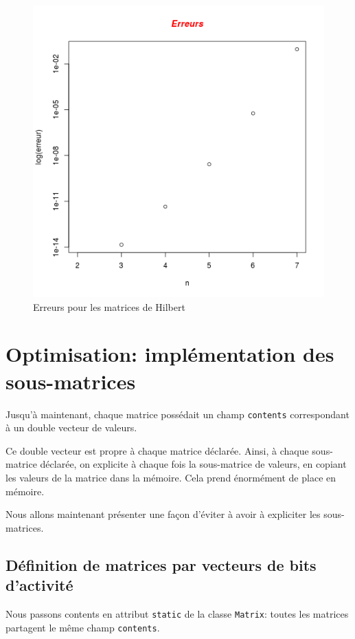\documentclass[a4paper,11pt]{article}
\begin{document}
\begin{figure}
  \centering
  \includegraphics[scale=0.5]{Error.png}
  \caption{Erreurs pour les matrices de Hilbert}
  \label{fig:phd}
\end{figure}

\section{Optimisation: implémentation des sous-matrices}


Jusqu'à maintenant, chaque matrice possédait un champ \texttt{contents} correspondant à un double vecteur de valeurs.

Ce double vecteur est propre à chaque matrice déclarée. Ainsi, à chaque sous-matrice déclarée, on explicite à chaque fois la sous-matrice de valeurs, en copiant les valeurs de la matrice dans la mémoire. Cela prend énormément de place en mémoire.

Nous allons maintenant présenter une façon d'éviter à avoir à expliciter les sous-matrices.

\subsection{Définition de matrices par vecteurs de bits d'activité}

Nous passons contents en attribut \texttt{static} de la classe \texttt{Matrix}: toutes les matrices partagent le même champ \texttt{contents}.
\end{document}
